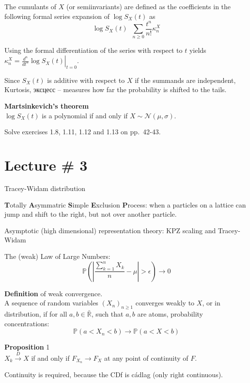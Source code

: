 \documentclass[a4paper]{article}
\newcommand{\brac}[1]{{\left ( #1 \right )}}
\newcommand{\induc}[1]{{\left . #1 \right \vert}}
\newcommand{\abs}[1]{{\left | #1 \right |}}
\newcommand{\Rbar}{{\bar{\mathbb{R}}}}
\newcommand{\pr}{\mathbb{P}}
\newcommand{\defn}{\mathop{\overset{\Delta}{=}}\nolimits}
\newcommand{\rus}[1]{\foreignlanguage{russian}{#1}}
\begin{document}
The cumulants of $X$ (or semiinvariants) are defined as the coefficients in the following formal series expansion of $\log S_X(t)$ as
\[\log S_X(t) \defn \sum_{n\geq 0} \frac{t^n}{n!} \kappa_n^X\]

Using the formal differentiation of the series with respect to $t$ yields
$\kappa_n^X = \induc{\frac{d^n}{dt^n} \log S_X(t)}_{t=0}$.

Since $S_X(t)$ is additive with respect to $X$ if the summands are independent,
Kurtosis, \rus{эксцесс} -- measures how far the probability is shifted to the tails.

\textbf{Martsinkevich's theorem}\hfill\\
$\log S_X(t)$ is a polynomial if and only if $X\sim\mathcal{N}(\mu,\sigma)$.


Solve exercises 1.8, 1.11, 1.12 and 1.13 on pp.~42-43.


\section{Lecture \# 3} %
\label{sec:lecture_3}

Tracey-Widam distribution

\textbf{T}otally \textbf{A}symmatric \textbf{S}imple \textbf{E}xclusion \textbf{P}rocess: when a particles on a lattice can jump and shift to the right, but not over another particle.


Asymptotic (high dimensional) representation theory:
KPZ scaling and Tracey-Widam

The (weak) Law of Large Numbers:
\[\pr\brac{\abs{ \frac{\sum_{k=1}^n X_k}{n}-\mu }>\epsilon} \to 0\]


\noindent \textbf{Definition} of weak convergence. \hfill\\
A sequence of random variables $\brac{X_n}_{n\geq1}$ converges weakly to $X$, or in distribution, if for all $a,b\in \Rbar$, such that $a,b$ are atoms, probability concentrations:
\[\pr\brac{a<X_n<b}\to \pr\brac{a<X<b}\]

\noindent \textbf{Proposition} 1\hfill \\
$X_k\overset{D}{\to}X$ if and only if $F_{X_n}\to F_X$ at any point of continuity of $F$.

Continuity is required, because the CDf is c\'adlag (only right continuous).
\end{document}
